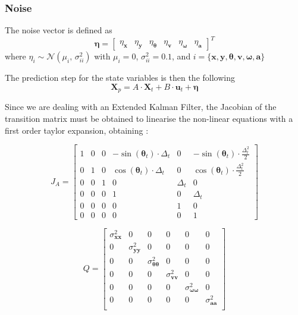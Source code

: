 \subsubsection{Noise}

\noindent
The noise vector is defined as
\begin{equation}
\boldsymbol \eta
=
\begin{bmatrix}
\eta_{\mathbf{x}}  &
\eta_{\mathbf{y}} &
\eta_{\boldsymbol \theta}  &
\eta_{\mathbf{v}} &
\eta_{\boldsymbol \omega} &
\eta_{\mathbf{a}}
\end{bmatrix} ^T
\end{equation}
where $\eta_i \sim \mathcal{N}(\mu_i,\,\sigma_{ii}^{2})$ with $\mu_i = 0$, $\sigma_{ii}^2 = 0.1$, and $ i = \{ \mathbf{x} , \mathbf{y} , \boldsymbol \theta , \mathbf{v} , \boldsymbol \omega , \mathbf{a} \}$

The prediction step for the state variables is then the following
\begin{equation}
\mathbf{X}_{p} = A \cdot \mathbf{X}_t + B \cdot \mathbf{u}_t + \boldsymbol \eta
\end{equation}

Since we are dealing with an Extended Kalman Filter, the Jacobian of the transition matrix must be obtained to linearise the non-linear equations with a first order taylor expansion, obtaining :

\begin{equation}
J_A
=
\begin{bmatrix}

1 & 0 & 0 & -\sin(\boldsymbol \theta_t) \cdot \Delta_t & 0 & -\sin(\boldsymbol \theta_t) \cdot  \frac{\Delta_t^2 }{2} \\
0 & 1 & 0 & \cos(\boldsymbol \theta_t) \cdot \Delta_t & 0 & \cos(\boldsymbol \theta_t) \cdot  \frac{\Delta_t^2 }{2} \\
0 & 0 & 1 & 0 & \Delta_t & 0 \\
0 & 0 & 0 & 1 & 0 & \Delta_t \\
0 & 0 & 0 & 0 & 1 & 0 \\
0 & 0 & 0 & 0 & 0 & 1
\end{bmatrix}
\end{equation}

\begin{equation}
Q
=
\begin{bmatrix}
\sigma_{\mathbf{xx}}^2 & 0 & 0 & 0 & 0 & 0 \\
0 & \sigma_{\mathbf{yy}}^2 & 0 & 0 & 0 & 0 \\
0 & 0 & \sigma_{\mathbf{\boldsymbol \theta \boldsymbol \theta}}^2 & 0 & 0 & 0 \\
0 & 0 & 0 & \sigma_{\mathbf{vv}}^2 & 0 & 0 \\
0 & 0 & 0 & 0 & \sigma_{{\boldsymbol \omega}{\boldsymbol \omega}}^2 & 0 \\
0 & 0 & 0 & 0 & 0 & \sigma_{\mathbf{aa}}^2 \\
\end{bmatrix}
\end{equation}

